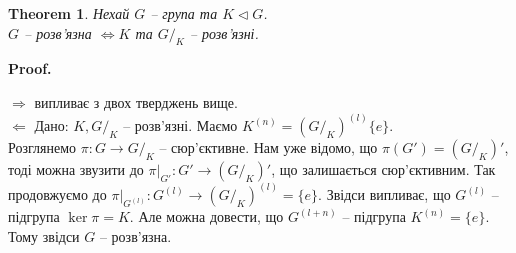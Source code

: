 \documentclass[a4paper, 10pt]{article}
\makeatletter
\def\rightproof{$\boxed{\Rightarrow}$ }
\def\leftproof{$\boxed{\Leftarrow}$ }
\theoremstyle{theoremdd}
\newtheorem{theorem}{Theorem}[subsection]
\theoremstyle{theoremdd}
\newtheorem{definition}[theorem]{Definition}
\theoremstyle{theoremdd}
\theoremstyle{theoremdd}
\theoremstyle{theoremdd}
\theoremstyle{theoremdd}
\theoremstyle{theoremdd}
\theoremstyle{theoremdd}
\theoremstyle{theoremdd}
\theoremstyle{theoremdd}
\theoremstyle{theoremdd}
\theoremstyle{theoremdd}
\theoremstyle{theoremdd}
\theoremstyle{theoremdd}
\theoremstyle{theoremdd}
\renewenvironment{proof}[1][Proof.\\]{\par
\pushQED{\hfill \qed}%
\normalfont \topsep6\p@\@plus6\p@\relax
\trivlist
\item\relax
{\bfseries
#1\@addpunct{.}}\hspace\labelsep\ignorespaces
}{%
\popQED\endtrivlist\@endpefalse
}
\makeatother
\begin{document}
\begin{theorem}
Нехай $G$ -- група та $K \triangleleft G$.\\
$G$ -- розв'язна $\iff K$ та $G/_K$ -- розв'язні.
\end{theorem}

\begin{proof}
\rightproof випливає з двох тверджень вище.
\bigskip \\
\leftproof Дано: $K, G/_K$ -- розв'язні. Маємо $K^{(n)} = (G/_K)^{(l)} \{e\}$.\\
Розглянемо $\pi \colon G \to G/_K$ -- сюр'єктивне. Нам уже відомо, що $\pi(G') = (G/_K)'$, тоді можна звузити до $\pi|_{G'} \colon G' \to (G/_K)'$, що залишається сюр'єктивним. Так продовжуємо до $\pi|_{G^{(l)}} \colon G^{(l)} \to (G/_K)^{(l)} = \{e\}$. Звідси випливає, що $G^{(l)}$ -- підгрупа $\ker \pi = K$. Але можна довести, що $G^{(l+n)}$ -- підгрупа $K^{(n)} = \{e\}$. Тому звідси $G$ -- розв'язна.
\end{proof}

\iffalse
\newpage
\section{Абелеві групи}
Надалі всюди, де задається група $\left<G,+\right>$, буде абелевою.
\subsection{Пряма сума}
\begin{definition}
Група $G$ називається \textbf{прямою сумою} підгруп $G_1,\dots,G_n$, якщо
\begin{align*}
\forall g \in G: g = g_1 + \dots + g_n,
\end{align*}
розклад якого єдиний, $g_i \in G_i, i = \overline{1,n}$.\\
Позначення: $G = G_1 \oplus \dots \oplus G_n$.
\end{definition}

Можна паралельно визначити нескінченну пряму суму. Це буде корисне узагальнення в деякому сенсі.

\begin{definition}
\end{definition}

\begin{definition}
Група $G$ називається \textbf{прямою сумою} сім'ї підгруп $\{G_i, i \in I\}$, якщо
\begin{align*}

\end{align*}
\end{definition}
\fi
\end{document}
